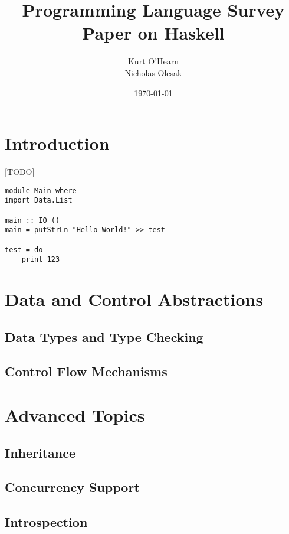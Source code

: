 \documentclass[titlepage,12pt]{article}
\title{Programming Language Survey Paper on Haskell}
\author{
        Kurt O'Hearn\\
        Nicholas Olesak\\
}
\date{\today}
\begin{document}
\maketitle 
\tableofcontents \newpage

\section{Introduction}
[TODO]~\cite{learnyouahaskell}
\begin{verbatim}
module Main where
import Data.List

main :: IO ()
main = putStrLn "Hello World!" >> test

test = do 
    print 123
\end{verbatim}

\section{Data and Control Abstractions}


\subsection{Data Types and Type Checking}
\subsection{Control Flow Mechanisms}


\section{Advanced Topics}

\subsection{Inheritance}
\subsection{Concurrency Support}
\subsection{Introspection}



\end{document}
